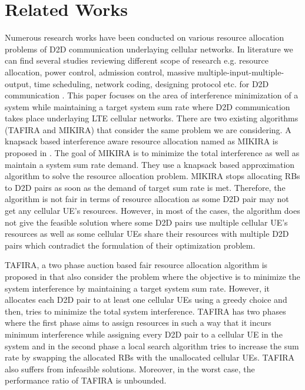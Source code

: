 \documentclass{ieeeaccess}
\begin{document}
\section{Related Works}\label{sec:relatedworks}
 
Numerous research works have been conducted on various resource allocation problems of D2D communication underlaying cellular networks. In literature we can find several studies reviewing different scope of research e.g. resource allocation, power control, admission control, massive multiple-input-multiple-output, time scheduling, network coding, designing protocol etc. for D2D communication \cite{mach2015band,asadi2014survey}. This paper focuses on the area of interference minimization of a system while maintaining a target system sum rate where D2D communication takes place underlaying LTE cellular networks. There are two existing algorithms (TAFIRA and MIKIRA) that consider the same problem we are considering. A knapsack based interference aware resource allocation named as MIKIRA is proposed in \cite{islam2015reducing}. The goal of MIKIRA is to minimize the total interference as well as  maintain a system sum rate demand. They use a knapsack based approximation algorithm to solve the resource allocation problem. MIKIRA stops allocating RBs to D2D pairs as soon as the demand of target sum rate is met. Therefore, the algorithm is not fair in terms of resource allocation as some D2D pair may not get any cellular UE's resources. However, in most of the cases, the algorithm does not give the feasible solution where some D2D pairs use multiple cellular UE's resources as well as some cellular UEs share their resources with multiple D2D pairs which contradict the formulation of their optimization problem. 

\smallskip
 
TAFIRA, a two phase auction based fair resource allocation algorithm is proposed in \cite{islam2016radio} that also consider the problem where the objective is to minimize the system interference by maintaining a target system sum rate. However, it allocates each D2D pair to at least one cellular UEs using a greedy choice and then, tries to minimize the total system interference. TAFIRA has two phases where the first phase aims to assign resources in such a way that it incurs minimum interference while assigning every D2D pair to a cellular UE in the system and in the second phase a local search algorithm tries to increase the sum rate by swapping the allocated RBs with the unallocated cellular UEs. TAFIRA also suffers from infeasible solutions. Moreover, in the worst case, the performance ratio of TAFIRA is unbounded. 
\end{document}
